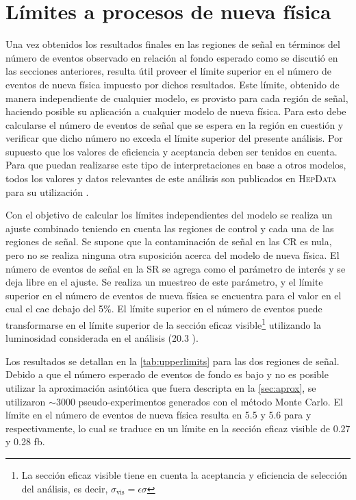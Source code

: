 \clearpage


\section{Límites a procesos de nueva física} \label{sec:model_independent}

Una vez obtenidos los resultados finales en las regiones de señal en términos
del número de eventos observado en relación al fondo esperado como se discutió
en las secciones anteriores, resulta útil proveer el límite superior en el número de eventos de
nueva física impuesto por dichos resultados. Este límite, obtenido de manera independiente de cualquier modelo,
es provisto para cada región de señal, haciendo posible su aplicación a cualquier modelo de
nueva física. Para esto debe calcularse
el número de eventos de señal que se espera
en la región en cuestión y verificar que dicho número no exceda el límite
superior del presente análisis. Por supuesto que los valores de eficiencia y aceptancia deben ser
tenidos en cuenta.
Para que puedan realizarse este tipo de interpretaciones en base a otros modelos, todos
los valores y datos relevantes de este análisis son publicados en \textsc{HepData}
para su utilización \cite{hepdata}.

Con el objetivo de calcular los límites independientes del modelo se realiza un
ajuste combinado teniendo en cuenta las regiones de control y cada una de las
regiones de señal. Se supone que la contaminación de señal en las CR es nula,
pero no se realiza ninguna otra suposición acerca del modelo de nueva física. El
número de eventos de señal en la SR se agrega como el parámetro de interés y se
deja libre en el ajuste. Se realiza un muestreo de este parámetro, y el
límite superior en el número de eventos de nueva física se encuentra para el
valor en el cual el {\cls} cae debajo del 5\%. El límite superior en el número
de eventos puede transformarse en el límite superior de la sección eficaz
visible\footnote{La sección eficaz visible tiene en cuenta
  la aceptancia y eficiencia de selección del análisis, es decir, $\sigma_{\text{vis}} = \epsilon\sigma$}
utilizando la luminosidad considerada en el análisis
(20.3 \ifb).

Los resultados se detallan en la \cref{tab:upperlimits} para las dos regiones de
señal. Debido a que el número esperado de eventos de fondo es bajo y no es
posible utilizar la aproximación asintótica que fuera descripta en la \cref{sec:aprox},
se utilizaron $\sim 3000$
pseudo-experimentos generados con el método Monte Carlo. El límite en el número
de eventos de nueva física resulta en 5.5 y 5.6 para {\SRL} y {\SRH}
respectivamente, lo cual se traduce en un límite en la sección eficaz visible de
0.27 y 0.28 fb.



